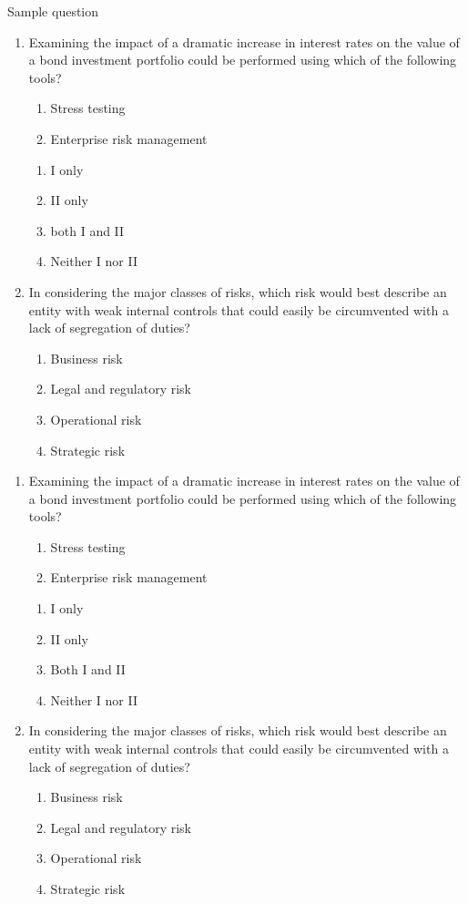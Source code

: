 \begin{frame}[allowframebreaks]{Sample question}

\begin{enumerate}
	\item Examining the impact of a dramatic increase in interest rates on the
value of a bond investment portfolio could be performed using which of the
following tools?
	\begin{enumerate}[I]
		\item Stress testing
		\item Enterprise risk management
	\end{enumerate}
    \begin{enumerate}[A]
    	\item I only
    	\item II only
    	\item both I and II
    	\item Neither I nor II
    \end{enumerate}
	\item In considering the major classes of risks, which risk would best describe
an entity with weak internal controls that could easily be circumvented with a
lack of segregation of duties?
	\begin{enumerate}[A]
		\item Business risk
		\item Legal and regulatory risk
		\item Operational risk
		\item Strategic risk
	\end{enumerate}
\end{enumerate}

\begin{enumerate}
	\item Examining the impact of a dramatic increase in interest rates on the
	value of a bond investment portfolio could be performed using which of the
	following tools?
	\begin{enumerate}[I]
		\item Stress testing
		\item Enterprise risk management
	\end{enumerate}
	\begin{enumerate}[A]
		\item I only
		\item II only
		\item {\color{red} Both I and II}
		\item Neither I nor II
	\end{enumerate}
	\item In considering the major classes of risks, which risk would best describe
	an entity with weak internal controls that could easily be circumvented with a
	lack of segregation of duties?
	\begin{enumerate}[A]
		\item Business risk
		\item Legal and regulatory risk
		\item {\color{red} Operational risk}
		\item Strategic risk
	\end{enumerate}
\end{enumerate}


\end{frame}
